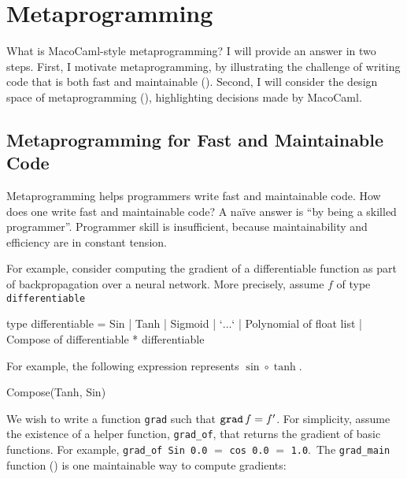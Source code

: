 \section{Metaprogramming}\label{section:metaprogramming-technical}
What is MacoCaml-style metaprogramming? I will provide an answer in two steps. First, I motivate metaprogramming, by illustrating the challenge of writing code that is both fast and maintainable (). Second, I will consider the design space of metaprogramming (), highlighting decisions made by MacoCaml.

\subsection{Metaprogramming for Fast and Maintainable Code}\label{subsection:metaprogramming-motivation}

Metaprogramming helps programmers write fast and maintainable code. How does one write fast and maintainable code? A naïve answer is ``by being a skilled programmer''. Programmer skill is insufficient, because maintainability and efficiency are in constant tension. 

For example, consider computing the gradient of a differentiable function as part of backpropagation over a neural network. More precisely, assume $f$ of type \texttt{differentiable}

\begin{ocaml}
type differentiable = Sin | Tanh | Sigmoid | `$\ldots$`
                    | Polynomial of float list
                    | Compose of differentiable * differentiable
\end{ocaml}
For example, the following expression represents $\sin\circ \tanh$. 
\begin{ocaml}
Compose(Tanh, Sin)
\end{ocaml}

We wish to write a function \texttt{grad} such that $\text{\texttt{grad}} \, f = f'$. For simplicity, assume the existence of a helper function, \texttt{grad_of}, that returns the gradient of basic functions. For example, \texttt{grad_of Sin 0.0} $=$ \texttt{cos 0.0} $=$ \texttt{1.0}.\ The \texttt{grad_main} function () is one maintainable way to compute gradients: 

